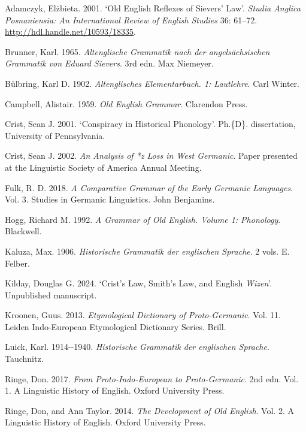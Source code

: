 \documentclass[
  british,
  a4paper,
]{article}
\newlength{\cslhangindent}
\newenvironment{CSLReferences}[2] %
 {\begin{list}{}{%
  \setlength{\itemindent}{0pt}
  \setlength{\leftmargin}{0pt}
  \setlength{\parsep}{0pt}
  \ifodd #1
   \setlength{\leftmargin}{\cslhangindent}
   \setlength{\itemindent}{-1\cslhangindent}
  \fi
  \setlength{\itemsep}{#2\baselineskip}}}
 {\end{list}}
\begin{document}
\protect{}\label{refs}
\begin{CSLReferences}{1}{1}
Adamczyk, Elżbieta. 2001. {`Old {English} Reflexes of {Sievers'} Law'}.
\emph{Studia Anglica Posnaniensia: An International Review of English
Studies} 36: 61--72. \url{http://hdl.handle.net/10593/18335}.

Brunner, Karl. 1965. \emph{{Altenglische Grammatik nach der
angels{ä}chsischen Grammatik von Eduard Sievers}}. 3rd edn. Max
Niemeyer.

Bülbring, Karl D. 1902. \emph{Altenglisches Elementarbuch. 1:
Lautlehre}. Carl Winter.

Campbell, Alistair. 1959. \emph{Old {English} Grammar}. Clarendon Press.

Crist, Sean J. 2001. {`Conspiracy in Historical Phonology'}. Ph.\{D\}.
dissertation, University of Pennsylvania.

Crist, Sean J. 2002. \emph{An Analysis of *{z} Loss in {West Germanic}}.
Paper presented at the Linguistic Society of America Annual Meeting.

Fulk, R. D. 2018. \emph{A Comparative Grammar of the Early {Germanic}
Languages}. Vol. 3. Studies in Germanic Linguistics. John Benjamins.

Hogg, Richard M. 1992. \emph{A Grammar of Old English. Volume 1:
Phonology}. Blackwell.

Kaluza, Max. 1906. \emph{{Historische Grammatik der englischen
Sprache}}. 2 vols. E. Felber.

Kilday, Douglas G. 2024. {`{Crist's} Law, {Smith's} Law, and {English}
\emph{Wizen}'}. Unpublished manuscript.

Kroonen, Guus. 2013. \emph{Etymological Dictionary of {Proto-Germanic}}.
Vol. 11. Leiden Indo-European Etymological Dictionary Series. Brill.

Luick, Karl. 1914-\/-1940. \emph{{Historische Grammatik der englischen
Sprache}}. Tauchnitz.

Ringe, Don. 2017. \emph{From {Proto-Indo-European} to {Proto-Germanic}}.
2nd edn. Vol. 1. A Linguistic History of English. Oxford University
Press.

Ringe, Don, and Ann Taylor. 2014. \emph{The Development of {Old
English}}. Vol. 2. A Linguistic History of English. Oxford University
Press.

\end{CSLReferences}
\end{document}

